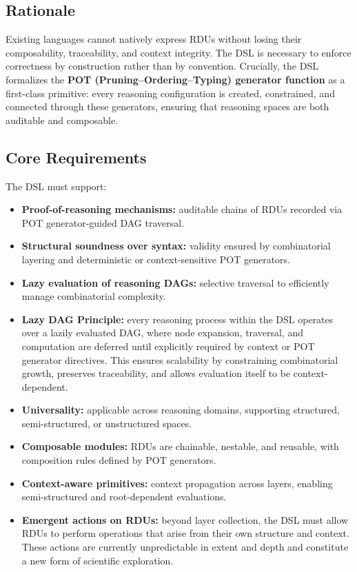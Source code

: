 \documentclass[11pt]{article}
\begin{document}
\subsection{Rationale}
Existing languages cannot natively express RDUs without losing their composability, traceability, and context integrity. The DSL is necessary to enforce correctness by construction rather than by convention.  
Crucially, the DSL formalizes the \textbf{POT (Pruning–Ordering–Typing) generator function} as a first-class primitive: every reasoning configuration is created, constrained, and connected through these generators, ensuring that reasoning spaces are both auditable and composable.

\subsection{Core Requirements}
The DSL must support:
\begin{itemize}
    \item \textbf{Proof-of-reasoning mechanisms:} auditable chains of RDUs recorded via POT generator-guided DAG traversal.
    \item \textbf{Structural soundness over syntax:} validity ensured by combinatorial layering and deterministic or context-sensitive POT generators.
    \item \textbf{Lazy evaluation of reasoning DAGs:} selective traversal to efficiently manage combinatorial complexity.
    \item \textbf{Lazy DAG Principle:} every reasoning process within the DSL operates over a lazily evaluated DAG, where node expansion, traversal, and computation are deferred until explicitly required by context or POT generator directives. This ensures scalability by constraining combinatorial growth, preserves traceability, and allows evaluation itself to be context-dependent.
    \item \textbf{Universality:} applicable across reasoning domains, supporting structured, semi-structured, or unstructured spaces.
    \item \textbf{Composable modules:} RDUs are chainable, nestable, and reusable, with composition rules defined by POT generators.
    \item \textbf{Context-aware primitives:} context propagation across layers, enabling semi-structured and root-dependent evaluations.
    \item \textbf{Emergent actions on RDUs:} beyond layer collection, the DSL must allow RDUs to perform operations that arise from their own structure and context. These actions are currently unpredictable in extent and depth and constitute a new form of scientific exploration.
\end{itemize}
\end{document}
